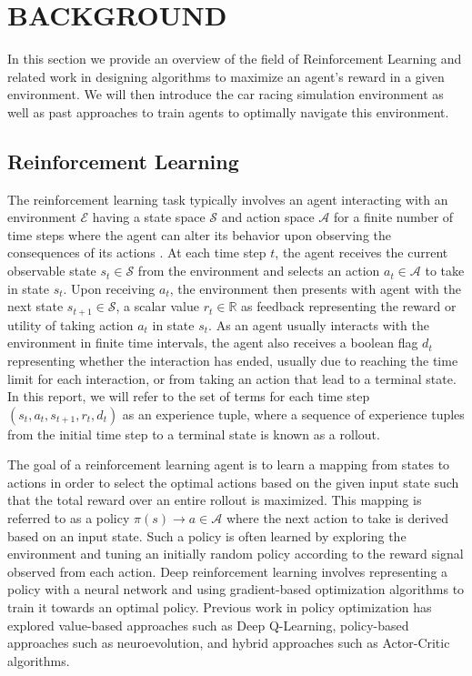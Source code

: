 \section{BACKGROUND}\label{background}

In this section we provide an overview of the field of Reinforcement Learning and related work in designing algorithms to maximize an agent's reward in a given environment. We will then introduce the car racing simulation environment as well as past approaches to train agents to optimally navigate this environment.

\subsection{Reinforcement Learning}

The reinforcement learning task typically involves an agent interacting with an environment $\mathcal{E}$ having a state space $\mathcal{S}$ and action space $\mathcal{A}$ for a finite number of time steps where the agent can alter its behavior upon observing the consequences of its actions \cite{2.0}. At each time step $t$, the agent receives the current observable state $s_t \in \mathcal{S}$ from the environment and selects an action $a_t \in \mathcal{A}$ to take in state $s_t$. Upon receiving $a_t$, the environment then presents with agent with the next state $s_{t+1} \in \mathcal{S}$, a scalar value $r_t \in \mathbb{R}$ as feedback representing the reward or utility of taking action $a_t$ in state $s_t$. As an agent usually interacts with the environment in finite time intervals, the agent also receives a boolean flag $d_t$ representing whether the interaction has ended, usually due to reaching the time limit for each interaction, or from taking an action that lead to a terminal state. In this report, we will refer to the set of terms for each time step $(s_t, a_t, s_{t+1}, r_t, d_t)$ as an experience tuple, where a sequence of experience tuples from the initial time step to a terminal state is known as a rollout.

The goal of a reinforcement learning agent is to learn a mapping from states to actions in order to select the optimal actions based on the given input state such that the total reward over an entire rollout is maximized. This mapping is referred to as a policy $\pi(s) \rightarrow a \in \mathcal{A}$ where the next action to take is derived based on an input state. Such a policy is often learned by exploring the environment and tuning an initially random policy according to the reward signal observed from each action. Deep reinforcement learning involves representing a policy with a neural network and using gradient-based optimization algorithms to train it towards an optimal policy. Previous work in policy optimization has explored value-based approaches such as Deep Q-Learning, policy-based approaches such as neuroevolution, and hybrid approaches such as Actor-Critic algorithms.

